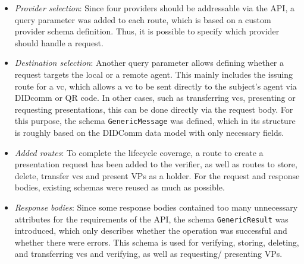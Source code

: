     \begin{itemize}
        \item \textit{Provider selection}: Since four providers should be addressable via the API, a query parameter was added to each route, which is based on a custom provider schema definition. Thus, it is possible to specify which provider should handle a request.
        \item \textit{Destination selection}: Another query parameter allows defining whether a request targets the local or a remote agent. This mainly includes the issuing route for a \ac{vc}, which allows a \ac{vc} to be sent directly to the subject's agent via DIDcomm or QR code. In other cases, such as transferring \acp{vc}, presenting or requesting presentations, this can be done directly via the request body. For this purpose, the schema \texttt{GenericMessage} was defined, which in its structure is roughly based on the DIDComm data model with only necessary fields.
        \item \textit{Added routes}: To complete the lifecycle coverage, a route to create a presentation request has been added to the verifier, as well as routes to store, delete, transfer \acp{vc} and present \acp{VP} as a holder. For the request and response bodies, existing schemas were reused as much as possible.
        \item \textit{Response bodies}: Since some response bodies contained too many unnecessary attributes for the requirements of the API, the schema \texttt{GenericResult} was introduced, which only describes whether the operation was successful and whether there were errors. This schema is used for verifying, storing, deleting, and transferring \acp{vc} and verifying, as well as requesting/ presenting \acp{VP}.
    \end{itemize}
    
